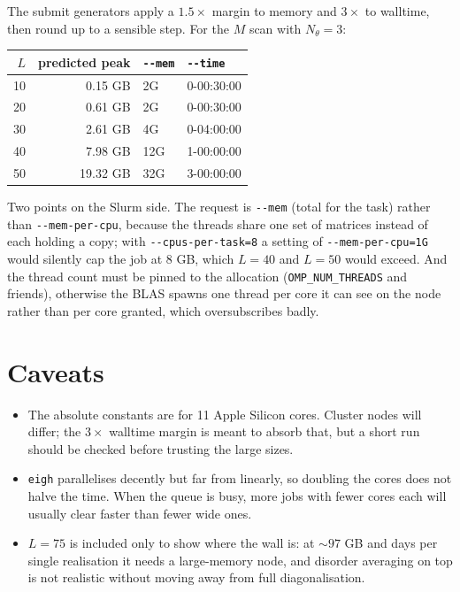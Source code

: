 \documentclass[11pt,a4paper]{article}
\begin{document}
The submit generators apply a $1.5\times$ margin to memory and $3\times$ to walltime, then
round up to a sensible step. For the $M$ scan with $N_\theta = 3$:

\begin{center}
\begin{tabular}{@{}rrll@{}}
\toprule
$L$ & predicted peak & \texttt{-{}-mem} & \texttt{-{}-time} \\
\midrule
10 &  0.15 GB &  2G & 0-00:30:00 \\
20 &  0.61 GB &  2G & 0-00:30:00 \\
30 &  2.61 GB &  4G & 0-04:00:00 \\
40 &  7.98 GB & 12G & 1-00:00:00 \\
50 & 19.32 GB & 32G & 3-00:00:00 \\
\bottomrule
\end{tabular}
\end{center}

\noindent
Two points on the Slurm side. The request is \texttt{-{}-mem} (total for the task) rather than
\texttt{-{}-mem-per-cpu}, because the threads share one set of matrices instead of each
holding a copy; with \texttt{-{}-cpus-per-task=8} a setting of \texttt{-{}-mem-per-cpu=1G}
would silently cap the job at 8 GB, which $L=40$ and $L=50$ would exceed. And the thread count
must be pinned to the allocation (\texttt{OMP\_NUM\_THREADS} and friends), otherwise the BLAS
spawns one thread per core it can see on the node rather than per core granted, which
oversubscribes badly.

\section{Caveats}

\begin{itemize}
  \item The absolute constants are for 11 Apple Silicon cores. Cluster nodes will differ;
        the $3\times$ walltime margin is meant to absorb that, but a short run should be
        checked before trusting the large sizes.
  \item \texttt{eigh} parallelises decently but far from linearly, so doubling the cores
        does not halve the time. When the queue is busy, more jobs with fewer cores each
        will usually clear faster than fewer wide ones.
  \item $L=75$ is included only to show where the wall is: at $\sim\!97$ GB and days per
        single realisation it needs a large-memory node, and disorder averaging on top is
        not realistic without moving away from full diagonalisation.
\end{itemize}
\end{document}

